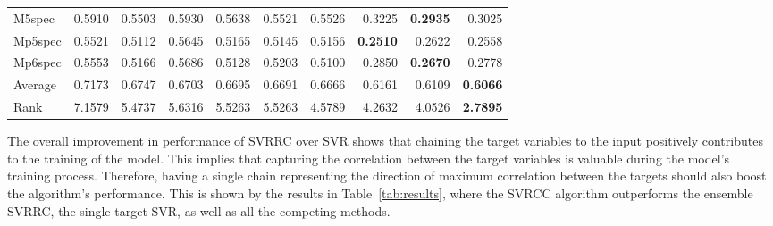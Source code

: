 \documentclass[preprint,12pt]{elsarticle}
\begin{document}
\begin{table*}[t!]
\begin{threeparttable}
{\begin{tabular}{lrrrrrrrrr}
M5spec & 0.5910 & 0.5503 & 0.5930 & 0.5638 & 0.5521 & 0.5526 & 0.3225 & \textbf{0.2935} & 0.3025\\ 
Mp5spec & 0.5521 & 0.5112 & 0.5645 & 0.5165 & 0.5145 & 0.5156 & \textbf{0.2510} & 0.2622 & 0.2558\\ 
Mp6spec & 0.5553 & 0.5166 & 0.5686 & 0.5128 & 0.5203 & 0.5100 & 0.2850 & \textbf{0.2670} & 0.2778\\ 
\hline
Average & 0.7173 & 0.6747 & 0.6703 & 0.6695 & 0.6691 & 0.6666 & 0.6161 & 0.6109 & \textbf{0.6066}\\ 
Rank & 7.1579 & 5.4737 & 5.6316 & 5.5263 & 5.5263 & 4.5789 & 4.2632 & 4.0526 & \textbf{2.7895}\\
\bottomrule
\end{tabular}}
\end{threeparttable}
\label{tab:results}
\bigskip
\end{table*}

The overall improvement in performance of SVRRC over SVR shows that chaining the target variables to the input positively contributes to the training of the model. This implies that capturing the correlation between the target variables is valuable during the model's training process. Therefore, having a single chain representing the direction of maximum correlation between the targets should also boost the algorithm's performance. This is shown by the results in Table~\ref{tab:results}, where the SVRCC algorithm outperforms the ensemble SVRRC, the single-target SVR, as well as all the competing methods.
\end{document}
